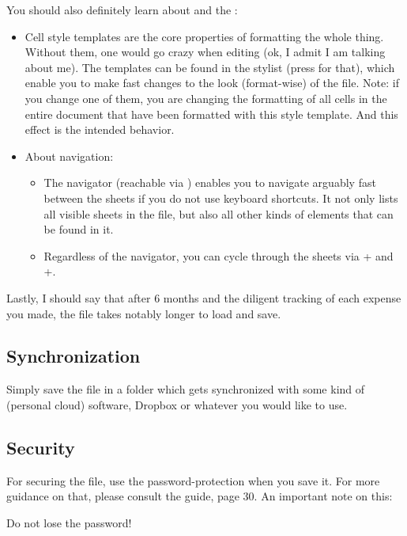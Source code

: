 You should also definitely learn about  and the :
\begin{itemize}
	\item Cell style templates are the core properties of formatting the whole thing.
	Without them, one would go crazy when editing \tfn (ok, I admit I am talking about me).
	The templates can be found in the stylist (press  for that), which enable you to make fast changes to the look (format-wise) of the file.
	Note: if you change one of them, you are changing the formatting of all cells in the entire document that have been formatted with this style template.
	And this effect is the intended behavior.
	\item About navigation:
	\begin{itemize}
		\item The navigator (reachable via ) enables you to navigate arguably fast between the sheets if you do not use keyboard shortcuts.
		It not only lists all visible sheets in the file, but also all other kinds of elements that can be found in it.
		\item Regardless of the navigator, you can cycle through the sheets via + and +.
	\end{itemize}
\end{itemize}

Lastly, I should say that after 6 months and the diligent tracking of each expense you made, the file takes notably longer to load and save.

\subsection{Synchronization}
\label{subsec:synchronization}

Simply save the file in a folder which gets synchronized with some kind of (personal cloud) software, \eg Dropbox or whatever you would like to use.

\subsection{Security}
\label{subsec:security}

For securing the file, use the password-protection when you save it.
For more guidance on that, please consult the  guide, page 30.
An important note on this:
\begin{specialnote}
Do not lose the password!
\end{specialnote}


